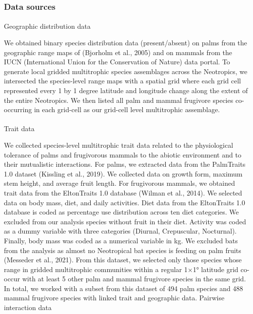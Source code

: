 \documentclass[
]{agujournal2019}
\makeatletter
\let\oldparagraph\paragraph
\renewcommand{\paragraph}{
    \@ifstar
      \xxxParagraphStar
      \xxxParagraphNoStar
  }
\newcommand{\xxxParagraphStar}[1]{\oldparagraph*{#1}\mbox{}}
\newcommand{\xxxParagraphNoStar}[1]{\oldparagraph{#1}\mbox{}}
\makeatother
\begin{document}
\subsubsection{Data sources}\label{data-sources}

\paragraph{Geographic distribution
data}\label{geographic-distribution-data}

We obtained binary species distribution data (present/absent) on palms
from the geographic range maps of (Bjorholm et al., 2005) and on mammals
from the IUCN (International Union for the Conservation of Nature) data
portal. To generate local gridded multitrophic species assemblages
across the Neotropics, we intersected the species-level range maps with
a spatial grid where each grid cell represented every 1 by 1 degree
latitude and longitude change along the extent of the entire Neotropics.
We then listed all palm and mammal frugivore species co-occurring in
each grid-cell as our grid-cell level multitrophic assemblage.

\paragraph{Trait data}\label{trait-data}

We collected species-level multitrophic trait data related to the
physiological tolerance of palms and frugivorous mammals to the abiotic
environment and to their mutualistic interactions. For palms, we
extracted data from the PalmTraits 1.0 dataset (Kissling et al., 2019).
We collected data on growth form, maximum stem height, and average fruit
length. For frugivorous mammals, we obtained trait data from the
EltonTraits 1.0 database (Wilman et al., 2014). We selected data on body
mass, diet, and daily activities. Diet data from the EltonTraits 1.0
database is coded as percentage use distribution across ten diet
categories. We excluded from our analysis species without fruit in their
diet. Activity was coded as a dummy variable with three categories
(Diurnal, Crepuscular, Nocturnal). Finally, body mass was coded as a
numerical variable in kg. We excluded bats from the analysis as almost
no Neotropical bat species is feeding on palm fruits (Messeder et al.,
2021). From this dataset, we selected only those species whose range in
gridded multitrophic communities within a regular 1×1° latitude grid
co-occur with at least 5 other palm and mammal frugivore species in the
same grid. In total, we worked with a subset from this dataset of 494
palm species and 488 mammal frugivore species with linked trait and
geographic data. Pairwise interaction data
\end{document}
